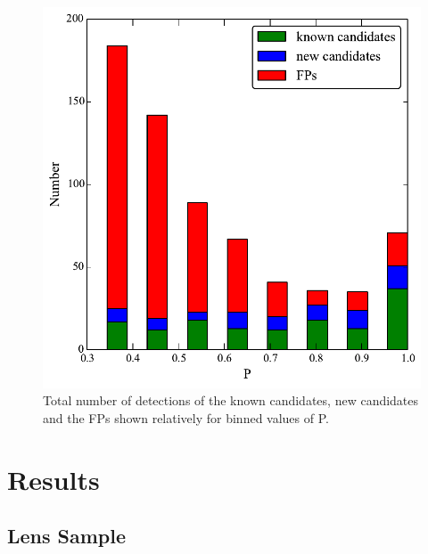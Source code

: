 \documentclass[useAMS,usenatbib,a4paper]{mn2e}
\begin{document}
\begin{figure}
\begin{center}
\includegraphics[scale=0.6]{sw-cfhtls-figs/cand_fp_P.pdf}
\caption{ \label{fig:stackP} Total number of detections of the known
candidates, new candidates and the FPs shown relatively for binned
values of P.
}
\end{center}
\end{figure}

\section{Results}
\label{sec:results}

\subsection{\sw Lens Sample}
\end{document}
